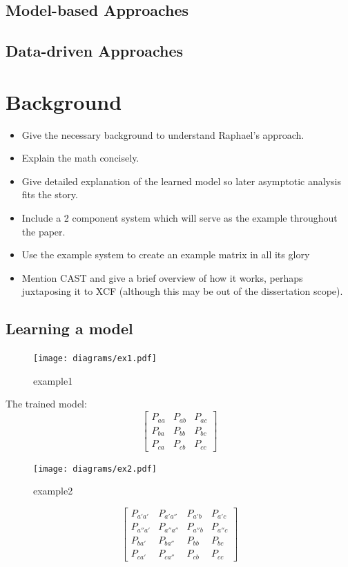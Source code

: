 \documentclass[11pt,a4paper]{article}
\begin{document}
\subsection{Model-based Approaches}
\subsection{Data-driven Approaches}

\section{Background}\label{cha:background}

\begin{itemize}
\item Give the necessary background to understand Raphael's approach.
\item Explain the math concisely.
\item Give detailed explanation of the learned model so later
  asymptotic analysis fits the story.
\item Include a 2 component system which will serve as the example
  throughout the paper.
\item Use the example system to create an example matrix in all its
  glory
\item Mention CAST and give a brief overview of how it works, perhaps
  juxtaposing it to XCF (although this may be out of the dissertation
  scope).
\end{itemize}

\subsection{Learning a model}


\begin{figure}
  \texttt{[image: diagrams/ex1.pdf]}
  \caption{example1}
  \label{fig:ex1}
\end{figure}

The trained model:
\[
\begin{bmatrix}
  P_{aa} & P_{ab} & P_{ac}\\
  P_{ba} & P_{bb} & P_{bc}\\
  P_{ca} & P_{cb} & P_{cc}
\end{bmatrix}
\]

\begin{figure}
  \texttt{[image: diagrams/ex2.pdf]}
  \caption{example2}
  \label{fig:ex2}
\end{figure}
\[
\begin{bmatrix}
  P_{a'a'}  & P_{a'a''}  & P_{a'b}  & P_{a'c}\\
  P_{a''a'} & P_{a''a''} & P_{a''b} & P_{a''c}\\
  P_{ba'}   & P_{ba''}   & P_{bb}   & P_{bc}\\
  P_{ca'}   & P_{ca''}   & P_{cb}   &  P_{cc}
\end{bmatrix}
\]
\end{document}

